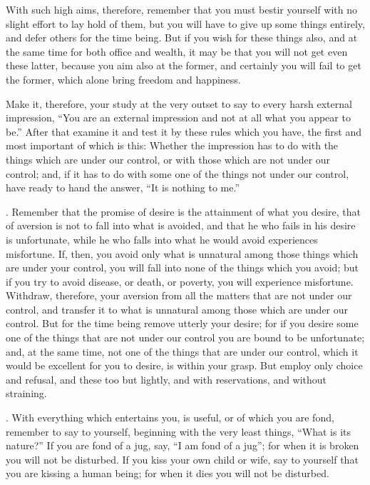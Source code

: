 With such high aims, therefore, remember that you must bestir yourself with no slight effort to lay hold of them, but you will have to give up some things entirely, and defer others for the time being. But if you wish for these things also, and at the same time for both office and wealth, it may be that you will not get even these latter, because you aim also at the former, and certainly you will fail to get the former, which alone bring freedom and happiness.

Make it, therefore, your study at the very outset to say to every harsh external impression, ``You are an external impression and not at all what you appear to be.'' After that examine it and test it by these rules which you have, the first and most important of which is this: Whether the impression has to do with the things which are under our control, or with those which are not under our control; and, if it has to do with some one of the things not under our control, have ready to hand the answer, ``It is nothing to me.''

. Remember that the promise of desire is the attainment of what you desire, that of aversion is not to fall into what is avoided, and that he who fails in his desire is unfortunate, while he who falls into what he would avoid experiences misfortune. If, then, you avoid only what is unnatural among those things which are under your control, you will fall into none of the things which you avoid; but if you try to avoid disease, or death, or poverty, you will experience misfortune. Withdraw, therefore, your aversion from all the matters that are not under our control, and transfer it to what is unnatural among those which are under our control. But for the time being remove utterly your desire; for if you desire some one of the things that are not under our control you are bound to be unfortunate; and, at the same time, not one of the things that are under our control, which it would be excellent for you to desire, is within your grasp. But employ only choice and refusal, and these too but lightly, and with reservations, and without straining.

. With everything which entertains you, is useful, or of which you are fond, remember to say to yourself, beginning with the very least things, ``What is its nature?'' If you are fond of a jug, say, ``I am fond of a jug''; for when it is broken you will not be disturbed. If you kiss your own child or wife, say to yourself that you are kissing a human being; for when it dies you will not be disturbed.

